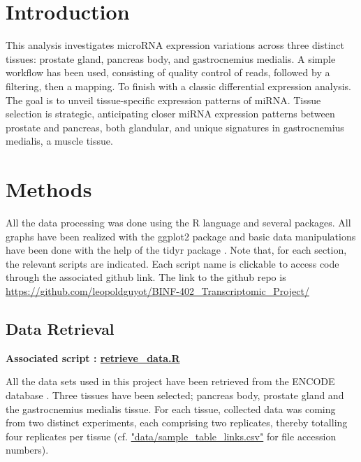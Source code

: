 \documentclass[a4paper, 11pt]{article}
\begin{document}
\begin{multicols}{2}
\section{Introduction}
This analysis investigates microRNA expression variations across three distinct tissues: prostate gland, pancreas body, and gastrocnemius medialis. A simple workflow has been used, consisting of quality control of reads, followed by a filtering, then a mapping. To finish with a classic differential expression analysis. The goal is to unveil tissue-specific expression patterns of miRNA. Tissue selection is strategic, anticipating closer miRNA expression patterns between prostate and pancreas, both glandular, and unique signatures in gastrocnemius medialis, a muscle tissue.

\section{Methods}
All the data processing was done using the R language \citep{Rlang} and several packages. All graphs have been realized with the ggplot2 package \citep{ggplot2} and basic data manipulations have been done with the help of the tidyr package \citep{tidyr}. Note that, for each section, the relevant scripts are indicated. Each script name is clickable to access code through the associated github link. The link to the github repo is
{\scriptsize \href{https://github.com/leopoldguyot/BINF-402_Transcriptomic_Project/}{https://github.com/leopoldguyot/BINF-402\_Transcriptomic\_Project/}}
\subsection{Data Retrieval}
\begin{scriptsize}
	\textbf{Associated script : \href{https://github.com/leopoldguyot/BINF-402_Transcriptomic_Project/blob/main/retrieve_data.R}{retrieve\_data.R}}
\end{scriptsize}



All the data sets used in this project have been retrieved from the ENCODE database \citep{luo2020new}.
Three tissues have been selected; pancreas body, prostate gland and the gastrocnemius medialis tissue.
For each tissue, collected data was coming from two distinct experiments, each comprising two replicates, thereby totalling four replicates per tissue (cf. \href{https://github.com/leopoldguyot/BINF-402_Transcriptomic_Project/blob/data/sample_table_links.csv}{"data/sample\_table\_links.csv"} for file accession numbers).


\end{multicols}
\end{document}
